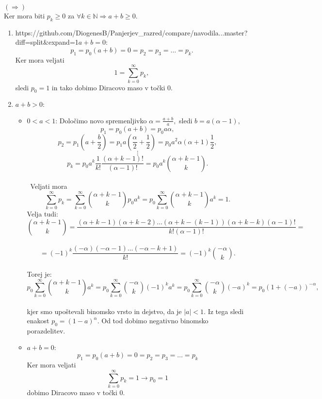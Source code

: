 \documentclass[a4paper]{article}
\begin{document}
\pagebreak
$(\Rightarrow)$ \\[1.5mm] Ker mora biti $p_k \geq 0$ za $\forall k \in \mathbb{N} \Rightarrow a+b \geq 0$.
\begin{enumerate}
	\item https://github.com/DiogenesB/Panjerjev_razred/compare/navodila...master?diff=split&expand=1\textbf{$a+b=0$}:\\ $$p_1 = p_0(a+b)=0=p_2=p_3= \ldots =p_k.$$ Ker mora veljati $$1 = \sum_{k=0}^{\infty}p_k,$$sledi $p_0=1$ in tako dobimo Diracovo maso v točki 0.
	\item \textbf{$a+b>0$}: 
	\begin{itemize}
		\item $0<a<1$:  Določimo novo spremenljivko $\alpha=\frac{a+b}{a},$ sledi $ b=a(\alpha-1),$ \\ $$p_1=p_0(a+b)=p_0 a \alpha,$$  $$p_2=p_1(a+\frac{b}{2})=p_1a(\frac{\alpha}{2}+\frac{1}{2})=p_0a^2\alpha(\alpha + 1) \frac{1}{2},$$  $$\vdots$$  $$p_k=p_0a^k\frac{1}{k!}\frac{(\alpha+k-1)!}{(\alpha-1)!}=p_0 a^k \binom{\alpha+k-1}{k}.$$ \\\ {Veljati mora $$\sum_{k=0}^{\infty}p_k=\sum_{k=0}^{\infty}\binom{\alpha+k-1}{k}p_0a^k=p_0\sum_{k=0}^{\infty}\binom{\alpha+k-1}{k}a^k=1.$$ Velja tudi: \\ $$\binom{\alpha+k-1}{k}=\frac{(\alpha+k-1)(\alpha+k-2)\ldots(\alpha+k-(k-1))(\alpha+k-k)(\alpha-1)!}{k!(\alpha-1)!}=$$ \\ $$=(-1)^k\frac{(-\alpha)(-\alpha-1)\ldots(-\alpha-k+1)}{k!}=(-1)^k\binom{-\alpha}{k}.$$ \\ Torej je: \\ $$p_0\sum_{k=0}^{\infty}\binom{\alpha+k-1}{k}a^k=p_0\sum_{k=0}^{\infty}\binom{-\alpha}{k}(-1)^ka^k=p_0\sum_{k=0}^{\infty}\binom{-\alpha}{k}(-a)^k=p_0(1+(-a))^{-\alpha},$$ \\ kjer smo upoštevali binomsko vrsto in dejstvo, da je $|a|<1.$ Iz tega sledi enakost $p_0=(1-a)^{\alpha}.$ Od tod dobimo negativno binomsko porazdelitev.}
	\item \textbf{$a+b=0$}:\\ $$p_1 = p_0(a+b)=0=p_2=p_3= \ldots =p_k$$ Ker mora veljati $$\sum_{k=0}^{\infty}p_k=1 \rightarrow p_0 = 1$$dobimo Diracovo maso v točki 0.
	

\end{itemize}
\end{enumerate}
\end{document}
